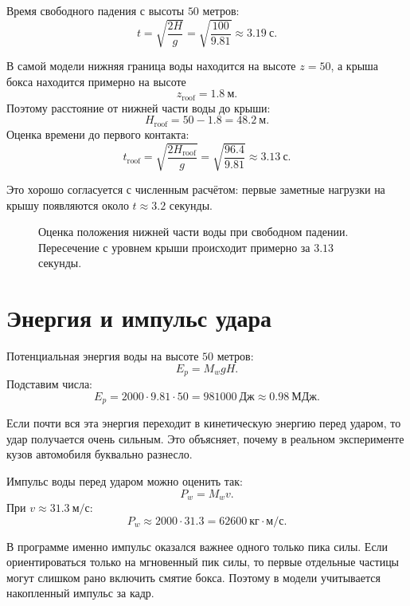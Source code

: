 \documentclass[12pt,a4paper]{article}
\begin{document}
Время свободного падения с высоты \(50\) метров:
\[
t = \sqrt{\frac{2H}{g}}
=
\sqrt{\frac{100}{9.81}}
\approx 3.19 \ \text{с}.
\]

В самой модели нижняя граница воды находится на высоте \(z=50\), а крыша бокса
находится примерно на высоте
\[
z_{\text{roof}} = 1.8 \ \text{м}.
\]
Поэтому расстояние от нижней части воды до крыши:
\[
H_{\text{roof}} = 50 - 1.8 = 48.2 \ \text{м}.
\]
Оценка времени до первого контакта:
\[
t_{\text{roof}} =
\sqrt{\frac{2H_{\text{roof}}}{g}}
=
\sqrt{\frac{96.4}{9.81}}
\approx 3.13 \ \text{с}.
\]

Это хорошо согласуется с численным расчётом: первые заметные нагрузки на крышу
появляются около \(t \approx 3.2\) секунды.

\begin{figure}[h]
\centering
{}
\caption{Оценка положения нижней части воды при свободном падении. Пересечение
с уровнем крыши происходит примерно за \(3.13\) секунды.}
\end{figure}

\section{Энергия и импульс удара}

Потенциальная энергия воды на высоте \(50\) метров:
\[
E_p = M_w g H.
\]
Подставим числа:
\[
E_p = 2000 \cdot 9.81 \cdot 50
= 981000 \ \text{Дж}
\approx 0.98 \ \text{МДж}.
\]

Если почти вся эта энергия переходит в кинетическую энергию перед ударом, то
удар получается очень сильным. Это объясняет, почему в реальном эксперименте
кузов автомобиля буквально разнесло.

Импульс воды перед ударом можно оценить так:
\[
P_w = M_w v.
\]
При \(v \approx 31.3 \ \text{м}/\text{с}\):
\[
P_w \approx 2000 \cdot 31.3
= 62600 \ \text{кг}\cdot\text{м}/\text{с}.
\]

В программе именно импульс оказался важнее одного только пика силы. Если
ориентироваться только на мгновенный пик силы, то первые отдельные частицы могут
слишком рано включить смятие бокса. Поэтому в модели учитывается накопленный
импульс за кадр.
\end{document}
